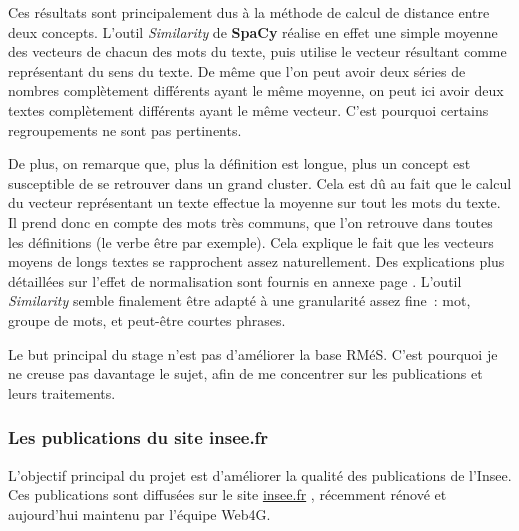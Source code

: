 
Ces résultats sont principalement dus à la méthode de calcul de distance entre deux concepts. L'outil \textit{Similarity} de \textbf{SpaCy} réalise en effet une simple moyenne des vecteurs de chacun des mots du texte, puis utilise le vecteur résultant comme représentant du sens du texte. De même que l'on peut avoir deux séries de nombres complètement différents ayant le même moyenne, on peut ici avoir deux textes complètement différents ayant le même vecteur. C'est pourquoi certains regroupements ne sont pas pertinents.

De plus, on remarque que, plus la définition est longue, plus un concept est susceptible de se retrouver dans un grand cluster. Cela est dû au fait que le calcul du vecteur représentant un texte effectue la moyenne sur tout les mots du texte. Il prend donc en compte des mots très communs, que l'on retrouve dans toutes les définitions (le verbe être par exemple). Cela explique le fait que les vecteurs moyens de longs textes se rapprochent assez naturellement. Des explications plus détaillées sur l'effet de normalisation sont fournis en annexe page \pageref{hierarchisation}. L'outil \textit{Similarity} semble finalement être adapté à une granularité assez fine~: mot, groupe de mots, et peut-être courtes phrases.
\newline

Le but principal du stage n'est pas d'améliorer la base RMéS. C'est pourquoi je ne creuse pas davantage le sujet, afin de me concentrer sur les publications et leurs traitements.
\label{section 1.2.1 - Premières tentatives}

\subsubsection{Les publications du site insee.fr}

L'objectif principal du projet est d'améliorer la qualité des publications de l'Insee. Ces publications sont diffusées sur le site \href{https://insee.fr/fr/accueil}{insee.fr} \cite{insee.fr}, récemment rénové et aujourd'hui maintenu par l'équipe Web4G.
\newline

